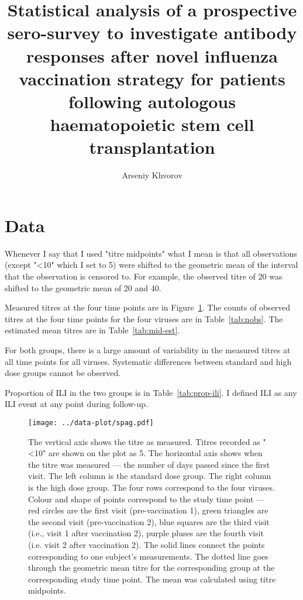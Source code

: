 \documentclass[11pt]{article}
\title{Statistical analysis of a prospective sero-survey to investigate
antibody responses
after novel influenza vaccination strategy
for patients following autologous
haematopoietic stem cell transplantation}
\author{Arseniy Khvorov}
\begin{document}
\maketitle

\section{Data}

Whenever I say that I used "titre midpoints" what I mean is that all
observations (except "<10" which I set to 5) were shifted to the geometric mean
of the interval that the observation is censored to. For example, the observed
titre of 20 was shifted to the geometric mean of 20 and 40.

Measured titres at the four time points are in Figure~\ref{fig:spag}.
The counts of observed titres at the four time points for the four viruses are
in Table~\ref{tab:nobs}.
The estimated mean titres are in Table~\ref{tab:mid-est}.

For both groups, there is a large amount of variability in the measured titres
at all time points for all viruses. Systematic differences between standard and
high dose groups cannot be observed.

Proportion of ILI in the two groups is in Table~\ref{tab:prop-ili}.
I defined ILI as any ILI event at any point during follow-up.







\begin{figure}[htp]
    \centering
    \texttt{[image: ../data-plot/spag.pdf]}
    \caption{
        The vertical axis shows the titre as measured.
        Titres recorded as "<10" are shown on the plot as 5.
        The horizontal axis shows when the titre was measured --- the number of
        days passed since the first visit.
        The left column is the standard dose group.
        The right column is the high dose group.
        The four rows correspond to the four viruses.
        Colour and shape of points correspond to the study time point ---
        red circles are the first visit (pre-vaccination 1),
        green triangles are the second visit (pre-vaccination 2),
        blue squares are the third visit (i.e., visit 1 after vaccination 2),
        purple pluses are the fourth visit (i.e. visit 2 after vaccination 2).
        The solid lines connect the points
        corresponding to one subject's measurements.
        The dotted line goes through the geometric mean titre for the
        corresponding group at the corresponding study time point. The mean was
        calculated using titre midpoints.
    }
    \label{fig:spag}
\end{figure}
\end{document}
